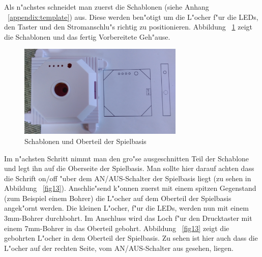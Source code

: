 
Als n"achstes schneidet man zuerst die Schablonen (siehe Anhang ~\ref{appendix:template}) aus. Diese werden ben"otigt um die L"ocher f"ur die LEDs, den Taster und den Stromanschlu"s richtig zu positionieren.
Abbildung ~\ref{fig12} zeigt die Schablonen und das fertig Vorbereitete Geh"ause.

\vspace{1cm}
\begin{figure}[!ht]
	\centering
  	\includegraphics[width=0.7\textwidth]{pictures/loolou_012.jpg}
	\caption{Schablonen und Oberteil der Spielbasis}
	\label{fig12}
\end{figure}
\vspace{0.5cm}

Im n"achsten Schritt nimmt man den gro"se ausgeschnitten Teil der Schablone und legt ihn auf die Oberseite der Spielbasis. Man sollte hier darauf achten dass die Schrift \grqq{}on/off\grqq{} "uber dem AN/AUS-Schalter der Spielbasis liegt (zu sehen in Abbildung ~\ref{fig13}). Anschlie"send k"onnen zuerst mit einem spitzen Gegenstand (zum Beispiel einem Bohrer) die L"ocher auf dem Oberteil der Spielbasis angek"ornt werden.
Die kleinen L"ocher, f"ur die LEDs, werden nun mit einem 3mm-Bohrer durchbohrt. Im Anschluss wird das Loch f"ur den Drucktaster mit einem 7mm-Bohrer in das Oberteil gebohrt. 
Abbildung ~\ref{fig13} zeigt die gebohrten L"ocher in dem Oberteil der Spielbasis. Zu sehen ist hier auch dass die L"ocher auf der rechten Seite, vom AN/AUS-Schalter aus gesehen, liegen.  

